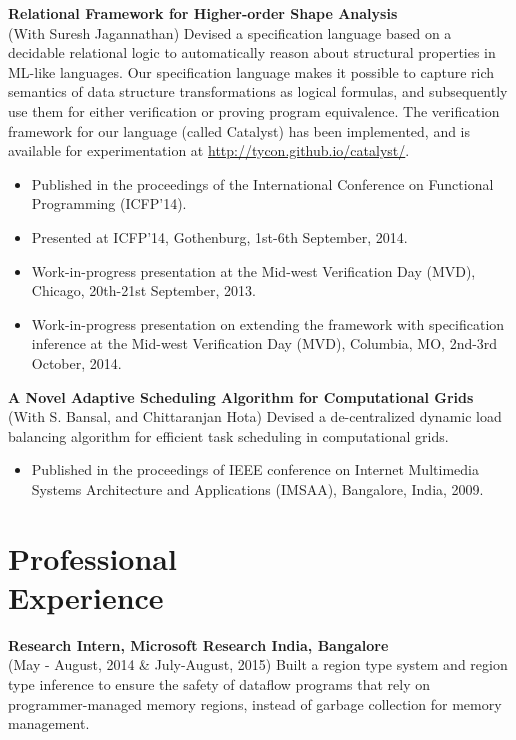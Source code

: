\documentclass[margin,line]{res}
\begin{document}
\begin{resume}
 {\bf Relational Framework for Higher-order Shape Analysis} \\
 (With Suresh Jagannathan) Devised a specification language based on a
 decidable relational logic to automatically reason about structural
 properties in ML-like languages. Our specification language makes it
 possible to capture rich semantics of data structure transformations
 as logical formulas, and subsequently use them for either
 verification or proving program equivalence. The verification
 framework for our language (called {\sc Catalyst}) has been
 implemented, and is available for experimentation at
 \url{http://tycon.github.io/catalyst/}.
 \begin{itemize} \itemsep -2pt  %
 \item Published in the proceedings of the International Conference on
 Functional Programming (ICFP'14).
 \item Presented at ICFP'14, Gothenburg, 1st-6th September, 2014.
 \item Work-in-progress presentation at the Mid-west Verification Day
 (MVD), Chicago, 20th-21st September, 2013.
 \item Work-in-progress presentation on extending the framework with
 specification inference at the Mid-west Verification Day (MVD),
 Columbia, MO, 2nd-3rd October, 2014.
 \end{itemize}

{\bf A Novel Adaptive Scheduling Algorithm for Computational Grids}\\
(With S. Bansal, and Chittaranjan Hota) Devised a de-centralized
dynamic load balancing algorithm for efficient task scheduling in
computational grids.
 \begin{itemize} \itemsep -2pt  %
 \item Published in the proceedings of IEEE conference on Internet
 Multimedia Systems Architecture and Applications (IMSAA), Bangalore,
 India, 2009.
 \end{itemize}

\section{Professional \\ Experience}

{\bf Research Intern, Microsoft Research India, Bangalore} \\
(May - August, 2014 \& July-August, 2015) 
Built a region type system and region type inference to ensure the
safety of dataflow programs that rely on programmer-managed memory
regions, instead of garbage collection for memory management.


\end{resume}
\end{document}

